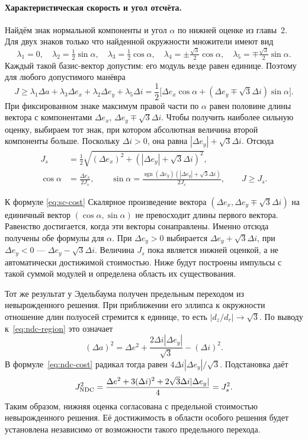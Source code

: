 \paragraph{Характеристическая скорость и угол отсчёта.}
Найдём знак нормальной компоненты и угол $\alpha$ по нижней
оценке из главы~2. Для двух знаков только что найденной окружности
множители имеют вид
\[
 \lambda_1=0,\quad \lambda_2=\tfrac12\sin\alpha,\quad
 \lambda_3=\tfrac12\cos\alpha,\quad
 \lambda_4=\pm\tfrac{\sqrt3}{2}\cos\alpha,\quad
 \lambda_5=\mp\tfrac{\sqrt3}{2}\sin\alpha.
\]
Каждый такой базис-вектор допустим: его модуль везде равен единице.
Поэтому для любого допустимого манёвра
\[
 J\geq\lambda_1\Delta a+\lambda_3\Delta e_x+
              \lambda_2\Delta e_y+\lambda_5\Delta i
 =\frac12\bigl[\Delta e_x\cos\alpha+
                  (\Delta e_y\mp\sqrt3\Delta i)\sin\alpha\bigr].
\]
При фиксированном знаке максимум правой части по $\alpha$ равен
половине длины вектора с компонентами
$\Delta e_x$, $\Delta e_y\mp\sqrt3\Delta i$.
Чтобы получить наиболее сильную оценку, выбираем тот знак,
при котором абсолютная величина второй компоненты больше.
Поскольку $\Delta i>0$, она равна
$|\Delta e_y|+\sqrt3\Delta i$.
Отсюда
\begin{equation}
\begin{aligned}
 J_s&=\frac12\sqrt{(\Delta e_x)^2+(|\Delta e_y|+\sqrt3\Delta i)^2},\\
 \cos\alpha&=\frac{\Delta e_x}{2J_s},\qquad
 \sin\alpha=\frac{\operatorname{sgn}(\Delta e_y)
                    (|\Delta e_y|+\sqrt3\Delta i)}{2J_s},
 \qquad J\geq J_s.
\end{aligned}
\label{eq:sc-cost}
\end{equation}

\begin{explanation}{К формуле \eqref{eq:sc-cost}}
Скалярное произведение вектора
$(\Delta e_x,\Delta e_y\mp\sqrt3\Delta i)$ на единичный вектор
$(\cos\alpha,\sin\alpha)$ не превосходит длины первого вектора.
Равенство достигается, когда эти векторы сонаправлены.
Именно отсюда получены обе формулы для $\alpha$.
При $\Delta e_y>0$ выбирается $\Delta e_y+\sqrt3\Delta i$,
при $\Delta e_y<0$ --- $\Delta e_y-\sqrt3\Delta i$.
Величина $J_s$ пока является нижней оценкой, а не автоматически
достижимой стоимостью. Ниже будут построены импульсы с такой
суммой модулей и определена область их существования.
\end{explanation}

Тот же результат у Эдельбаума получен предельным переходом
из невырожденного решения. При приближении его эллипса к окружности
отношение длин полуосей стремится к единице, то есть
$|d_z/d_r|\to\sqrt3$. По выводу к~\eqref{eq:ndc-region}
это означает
\[
 (\Delta a)^2=\Delta e^2+
           \frac{2\Delta i|\Delta e_y|}{\sqrt3}-(\Delta i)^2.
\]
В формуле~\eqref{eq:ndc-cost} радикал тогда равен
$4\Delta i|\Delta e_y|/\sqrt3$. Подстановка даёт
\[
 J_{\rm NDC}^2=\frac{\Delta e^2+3(\Delta i)^2
                              +2\sqrt3\Delta i|\Delta e_y|}{4}=J_s^2.
\]
Таким образом, нижняя оценка согласована с предельной стоимостью
невырожденного решения. Её достижимость в области особого решения
будет установлена независимо от возможности такого предельного перехода.


